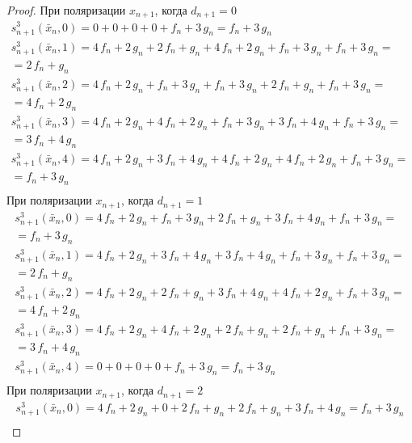 \documentclass[bibliography=totoc, a4paper, 14pt]{extarticle}
\begin{document}
 \begin{proof}


При поляризации $x_{n+1}$, когда $d_{n+1} = 0$
$$\begin{array}{l}
s_{n+1}^3(\bar{x}_n, 0) = 0 + 0 + 0 + 0 + f_n + 3\,g_n = f_n + 3\,g_n \\
s_{n+1}^3(\bar{x}_n, 1) = 4\,f_n + 2\,g_n + 2\,f_n + g_n + 4\,f_n + 2\,g_n + f_n + 3\,g_n + f_n + 3\,g_n =\\
= 2\,f_n + g_n \\
s_{n+1}^3(\bar{x}_n, 2) = 4\,f_n + 2\,g_n + f_n + 3\,g_n + f_n + 3\,g_n + 2\,f_n + g_n + f_n + 3\,g_n =\\
= 4\,f_n + 2\,g_n \\
s_{n+1}^3(\bar{x}_n, 3) = 4\,f_n + 2\,g_n + 4\,f_n + 2\,g_n + f_n + 3\,g_n + 3\,f_n + 4\,g_n + f_n + 3\,g_n =\\
= 3\,f_n + 4\,g_n \\
s_{n+1}^3(\bar{x}_n, 4) = 4\,f_n + 2\,g_n + 3\,f_n + 4\,g_n + 4\,f_n + 2\,g_n + 4\,f_n + 2\,g_n + f_n + 3\,g_n =\\
= f_n + 3\,g_n \\
\end{array}$$
При поляризации $x_{n+1}$, когда $d_{n+1} = 1$
$$\begin{array}{l}
s_{n+1}^3(\bar{x}_n, 0) = 4\,f_n + 2\,g_n + f_n + 3\,g_n + 2\,f_n + g_n + 3\,f_n + 4\,g_n + f_n + 3\,g_n =\\
= f_n + 3\,g_n \\
s_{n+1}^3(\bar{x}_n, 1) = 4\,f_n + 2\,g_n + 3\,f_n + 4\,g_n + 3\,f_n + 4\,g_n + f_n + 3\,g_n + f_n + 3\,g_n =\\
= 2\,f_n + g_n \\
s_{n+1}^3(\bar{x}_n, 2) = 4\,f_n + 2\,g_n + 2\,f_n + g_n + 3\,f_n + 4\,g_n + 4\,f_n + 2\,g_n + f_n + 3\,g_n =\\
= 4\,f_n + 2\,g_n \\
s_{n+1}^3(\bar{x}_n, 3) = 4\,f_n + 2\,g_n + 4\,f_n + 2\,g_n + 2\,f_n + g_n + 2\,f_n + g_n + f_n + 3\,g_n =\\
= 3\,f_n + 4\,g_n \\
s_{n+1}^3(\bar{x}_n, 4) = 0 + 0 + 0 + 0 + f_n + 3\,g_n = f_n + 3\,g_n \\
\end{array}$$
При поляризации $x_{n+1}$, когда $d_{n+1} = 2$
$$\begin{array}{l}
s_{n+1}^3(\bar{x}_n, 0) = 4\,f_n + 2\,g_n + 0 + 2\,f_n + g_n + 2\,f_n + g_n + 3\,f_n + 4\,g_n = f_n + 3\,g_n \\

\end{array}$$
\end{proof}
\end{document}
